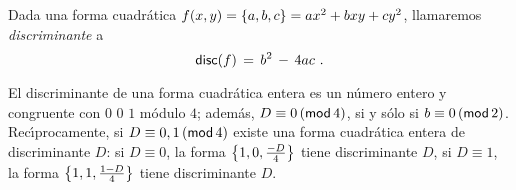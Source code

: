 
\begin{defDefiniciones}\label{def:definiciones:discriminante}
	Dada una forma cuadr\'atica $f(x,y)=\binaria{a,b,c}=ax^2+bxy+cy^2$,
	llamaremos \emph{discriminante} a
	\begin{displaymath}
		\discriminante(f)\,=\,b^2\,-\,4ac
		\text{ .}
	\end{displaymath}
\end{defDefiniciones}

\begin{obsDefiniciones}\label{obs:definiciones:discriminante}
	El discriminante de una forma cuadr\'atica entera es un
	n\'umero entero y congruente con $0$ 0 $1$ m\'odulo $4$;
	adem\'as, $D\equiv 0\tmodulo[4]$, si y s\'olo si
	$b\equiv 0\tmodulo[2]$.
	Rec\'{\i}procamente, si $D\equiv 0,1\tmodulo[4]$ existe una
	forma cuadr\'atica entera de discriminante $D$:
	si $D\equiv 0$, la forma $\binaria{1,0,\frac{-D} 4}$ tiene
	discriminante $D$, si $D\equiv 1$, la forma
	$\binaria{1,1,\frac{1-D} 4}$ tiene discriminante $D$.
\end{obsDefiniciones}

